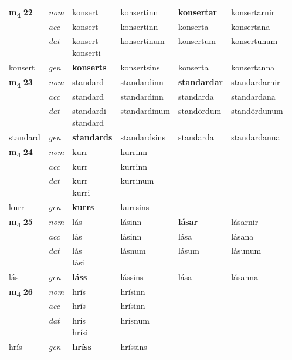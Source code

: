 \begin{longtable}[l]{X>{\footnotesize\itshape}XXXXX}
\multirow{3}{*}{{{\textbf{m{\textsubscript{4}}} \Large{\textbf{22}}}}}  
 & nom & konsert & konsertinn    & \textbf{konsertar} & konsertarnir  \\*
 & acc & konsert  & konsertinn   & konserta  & konsertana \\*
 & dat & \specialcell{konsert\\ konserti} & konsertinum   & konsertum & konsertunum \\*
 {\footnotesize{konsert}} &  gen & \textbf{konserts}  & konsertsins  & konserta & konsertanna \\
\cmidrule{1-6}


\multirow{3}{*}{{{\textbf{m{\textsubscript{4}}} \Large{\textbf{23}}}}}  
 & nom & standard & standardinn    & \textbf{standardar} & standardarnir  \\*
 & acc & standard  & standardinn   & standarda  & standardana \\*
 & dat & \specialcell{standardi\\ standard} & standardinum   & standördum & standördunum \\*
 {\footnotesize{standard}} &  gen & \textbf{standards}  & standardsins  & standarda & standardanna \\
\cmidrule{1-6}


\multirow{3}{*}{{{\textbf{m{\textsubscript{4}}} \Large{\textbf{24}}}}}  
 & nom & kurr & kurrinn    & \textbf{} &   \\*
 & acc & kurr  & kurrinn   &   &  \\*
 & dat & \specialcell{kurr\\ kurri} & kurrinum   &  &  \\*
 {\footnotesize{kurr}} &  gen & \textbf{kurrs}  & kurrsins  &  &  \\
\cmidrule{1-6}


\multirow{3}{*}{{{\textbf{m{\textsubscript{4}}} \Large{\textbf{25}}}}}  
 & nom & lás & lásinn    & \textbf{lásar} & lásarnir  \\*
 & acc & lás  & lásinn   & lása  & lásana \\*
 & dat & \specialcell{lás\\ lási} & lásnum   & lásum & lásunum \\*
 {\footnotesize{lás}} &  gen & \textbf{láss}  & lássins  & lása & lásanna \\
\cmidrule{1-6}


\multirow{3}{*}{{{\textbf{m{\textsubscript{4}}} \Large{\textbf{26}}}}}  
 & nom & hrís & hrísinn    & \textbf{} &   \\*
 & acc & hrís  & hrísinn   &   &  \\*
 & dat & \specialcell{hrís\\ hrísi} & hrísnum   &  &  \\*
 {\footnotesize{hrís}} &  gen & \textbf{hríss}  & hríssins  &  &  \\
\cmidrule{1-6}



\end{longtable}
